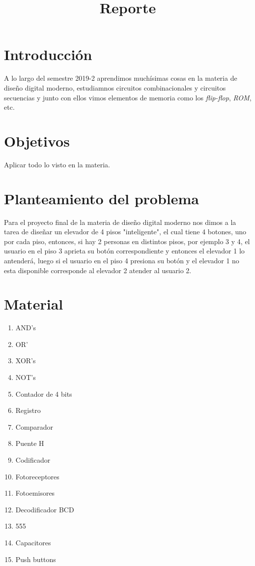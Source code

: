 \documentclass{mylib/reporte}
\title{Reporte}
\begin{document}
\coverPage

\newpage

\section{Introducción}

A lo largo del semestre 2019-2 aprendimos muchísimas cosas en la materia de diseño digital moderno, estudiamnos circuitos combinacionales y circuitos secuencias y junto con ellos vimos elementos de memoria como los \textit{flip-flop}, \textit{ROM}, etc.

\section{Objetivos}

Aplicar todo lo visto en la materia.

\section{Planteamiento del problema}

Para el proyecto final de la materia de diseño digital moderno nos dimos a la tarea de diseñar un elevador de 4 pisos "inteligente", el cual tiene 4 botones, uno por cada piso, entonces, si hay 2 personas en distintos pisos, por ejemplo 3 y 4, el usuario en el piso 3 aprieta su botón correspondiente y entonces el elevador 1 lo antenderá, luego si el usuario en el piso 4 presiona su botón y el elevador 1 no esta disponible corresponde al elevador 2 atender al usuario 2.

\section{Material}

\begin{enumerate}
  \item AND's
  \item OR'
  \item XOR's
  \item NOT's
  \item Contador de 4 bits
  \item Registro
  \item Comparador
  \item Puente H
  \item Codificador
  \item Fotoreceptores
  \item Fotoemisores
  \item Decodificador BCD
  \item 555
  \item Capacitores
  \item Push buttons
  
\end{enumerate}
\end{document}
